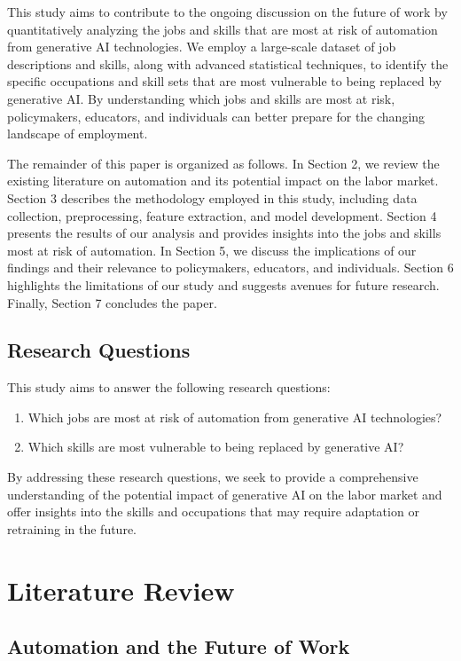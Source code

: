 \documentclass{article}
\begin{document}
This study aims to contribute to the ongoing discussion on the future of work by quantitatively analyzing the jobs and skills that are most at risk of automation from generative AI technologies. We employ a large-scale dataset of job descriptions and skills, along with advanced statistical techniques, to identify the specific occupations and skill sets that are most vulnerable to being replaced by generative AI. By understanding which jobs and skills are most at risk, policymakers, educators, and individuals can better prepare for the changing landscape of employment.

The remainder of this paper is organized as follows. In Section 2, we review the existing literature on automation and its potential impact on the labor market. Section 3 describes the methodology employed in this study, including data collection, preprocessing, feature extraction, and model development. Section 4 presents the results of our analysis and provides insights into the jobs and skills most at risk of automation. In Section 5, we discuss the implications of our findings and their relevance to policymakers, educators, and individuals. Section 6 highlights the limitations of our study and suggests avenues for future research. Finally, Section 7 concludes the paper.

\subsection{Research Questions}

This study aims to answer the following research questions:

\begin{enumerate}
  \item Which jobs are most at risk of automation from generative AI technologies?
  \item Which skills are most vulnerable to being replaced by generative AI?
\end{enumerate}

By addressing these research questions, we seek to provide a comprehensive understanding of the potential impact of generative AI on the labor market and offer insights into the skills and occupations that may require adaptation or retraining in the future.
\section{Literature Review}

\subsection{Automation and the Future of Work}
\end{document}
